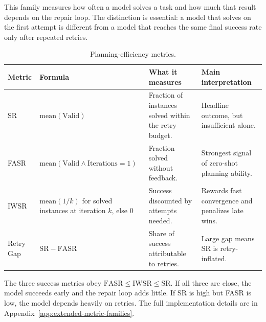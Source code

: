 This family measures how often a model solves a task and how much that result depends on the repair loop. The distinction is essential: a model that solves on the first attempt is different from a model that reaches the same final success rate only after repeated retries.

\begin{table}[H]\small
\centering
\begin{tabularx}{\linewidth}{@{}l l Y Y@{}}
\toprule
\textbf{Metric} & \textbf{Formula} & \textbf{What it measures} & \textbf{Main interpretation}\\
\midrule
SR & \(\mathrm{mean}(\mathrm{Valid})\) & Fraction of instances solved within the retry budget. & Headline outcome, but insufficient alone.\\
\addlinespace
FASR & \(\mathrm{mean}(\mathrm{Valid}\land \mathrm{Iterations}=1)\) & Fraction solved without feedback. & Strongest signal of zero-shot planning ability.\\
\addlinespace
IWSR & \(\mathrm{mean}(1/k)\) for solved instances at iteration \(k\), else \(0\) & Success discounted by attempts needed. & Rewards fast convergence and penalizes late wins.\\
\addlinespace
Retry Gap & \(\mathrm{SR}-\mathrm{FASR}\) & Share of success attributable to retries. & Large gap means SR is retry-inflated.\\
\bottomrule
\end{tabularx}
\caption{Planning-efficiency metrics.}
\label{tab:efficiency-metrics-compact}
\end{table}

The three success metrics obey \(\mathrm{FASR}\leq\mathrm{IWSR}\leq\mathrm{SR}\). If all three are close, the model succeeds early and the repair loop adds little. If SR is high but FASR is low, the model depends heavily on retries. The full implementation details are in Appendix~\ref{app:extended-metric-families}.
